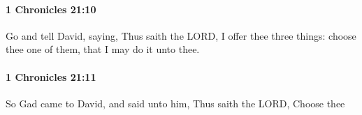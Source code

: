 		\paragraph{1 Chronicles 21:10} %
			\label{1CHRONICLES-21-10}

			Go and tell David, saying, Thus saith the LORD, I offer thee three things: choose thee one of them, that I may do it unto thee.


		\paragraph{1 Chronicles 21:11} %
			\label{1CHRONICLES-21-11}

			So Gad came to David, and said unto him, Thus saith the LORD, Choose thee


